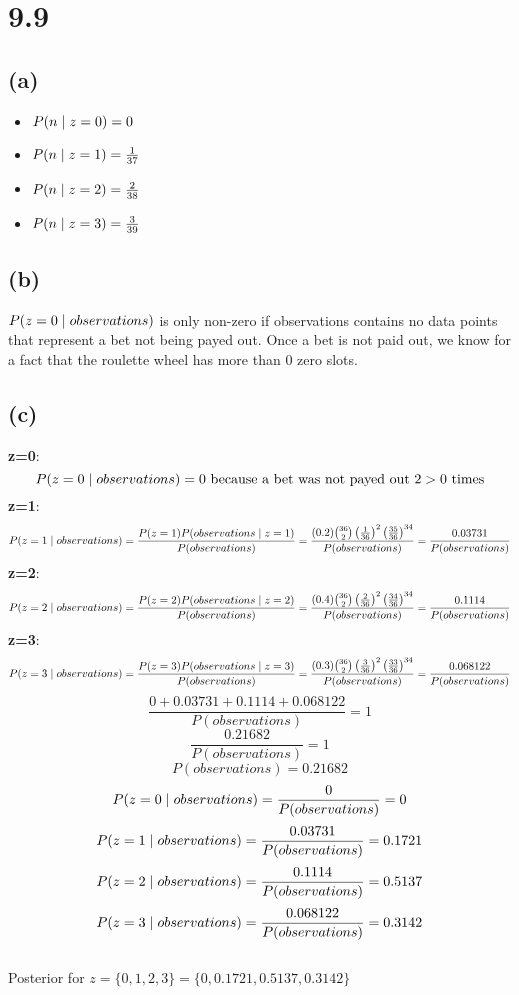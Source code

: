 \documentclass[11pt]{article}
\newcommand{\given}{\hspace{1mm}|\hspace{1mm}}
\begin{document}
\section*{9.9}
\subsection*{(a)}
\begin{itemize}
	\item $P(n\given z=0)=0$
	\item $P(n\given z=1)=\frac{1}{37}$
	\item $P(n\given z=2)=\frac{2}{38}$
	\item $P(n\given z=3)=\frac{3}{39}$
\end{itemize}
\subsection*{(b)}
$P(z=0\given observations)$ is only non-zero if observations contains no data points that represent a bet not being payed out. Once a bet is not paid out, we know for a fact that the roulette wheel has more than 0 zero slots.
\subsection*{(c)}
\textbf{z=0}:
\[P(z=0\given observations)=0 \text{ because a bet was not payed out 2} > \text{0 times}\]
\textbf{z=1}:
\[P(z=1\given observations)=\frac{P(z=1)P(observations\given z=1)}{P(observations)}=\frac{(0.2)\binom{36}{2}\left(\frac{1}{36}\right)^2\left(\frac{35}{36}\right)^{34}}{P(observations)}=\frac{0.03731}{P(observations)}\]
\textbf{z=2}:
\[P(z=2\given observations)=\frac{P(z=2)P(observations\given z=2)}{P(observations)}=\frac{(0.4)\binom{36}{2}\left(\frac{2}{36}\right)^2\left(\frac{34}{36}\right)^{34}}{P(observations)}=\frac{0.1114}{P(observations)}\]
\textbf{z=3}:
\[P(z=3\given observations)=\frac{P(z=3)P(observations\given z=3)}{P(observations)}=\frac{(0.3)\binom{36}{2}\left(\frac{3}{36}\right)^2\left(\frac{33}{36}\right)^{34}}{P(observations)}=\frac{0.068122}{P(observations)}\]
\clearpage
\[\frac{0+0.03731+0.1114+0.068122}{P(observations)}=1\]
\[\frac{0.21682}{P(observations)}=1\]
\[P(observations)=0.21682\]
\[P(z=0\given observations)=\frac{0}{P(observations)}=0\]
\[P(z=1\given observations)=\frac{0.03731}{P(observations)}=0.1721\]
\[P(z=2\given observations)=\frac{0.1114}{P(observations)}=0.5137\]
\[P(z=3\given observations)=\frac{0.068122}{P(observations)}=0.3142\]
\\
Posterior for $z=\{0,1,2,3\}=\{0, 0.1721,0.5137,0.3142\}$
\end{document}
